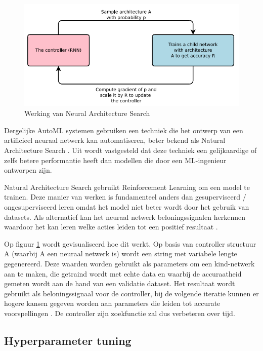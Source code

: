 \begin{figure}
    \includegraphics[width=\linewidth]{img/nas.png}
    \caption{Werking van Neural Architecture Search  \autocite{ZophL2016}}
    \label{fig:nas}
\end{figure}

Dergelijke AutoML systemen gebruiken een techniek die het ontwerp van een artificieel neuraal netwerk kan automatiseren, beter bekend als Natural Architecture Search \autocite{Elsken2019}. Uit \textcite{ZophL2016} wordt vastgesteld dat deze techniek een gelijkaardige of zelfs betere performantie heeft dan modellen die door een ML-ingenieur ontworpen zijn.

Natural Architecture Search gebruikt Reinforcement Learning om een model te trainen. Deze manier van werken is fundamenteel anders dan gesuperviseerd / ongesuperviseerd leren omdat het model niet beter wordt door het gebruik van datasets. Als alternatief kan het neuraal netwerk beloningssignalen herkennen waardoor het kan leren welke acties leiden tot een positief resultaat \autocite{Lievens2019}.

Op figuur \ref{fig:nas} wordt gevisualiseerd hoe dit werkt. Op basis van controller structuur A (waarbij A een neuraal netwerk is) wordt een string met variabele lengte gegenereerd. Deze waarden worden gebruikt als parameters om een kind-netwerk aan te maken, die getraind wordt met echte data en waarbij de accuraatheid gemeten wordt aan de hand van een validatie dataset. Het resultaat wordt gebruikt als beloningssignaal voor de controller, bij de volgende iteratie kunnen er hogere kansen gegeven worden aan parameters die leiden tot accurate voorspellingen \autocite{ZophL2016}. De controller zijn zoekfunctie zal dus verbeteren over tijd.

\subsection{Hyperparameter tuning}

